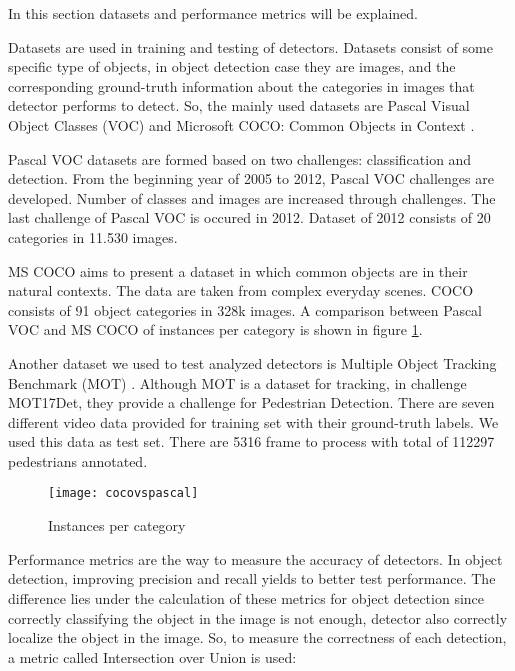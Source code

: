 \documentclass{article}
\begin{document}
\setlength{\parindent}{6ex}

\indent

In this section datasets and performance metrics will be explained. \par 
Datasets are used in training and testing of detectors. Datasets consist of some 
specific type of objects, in object detection case they are images, and the 
corresponding ground-truth information about the categories in images that 
detector performs to detect. So, the mainly used datasets are Pascal Visual Object 
Classes (VOC) \cite{pascalvoc} and Microsoft COCO: Common Objects in Context 
\cite{mscoco}. \par

Pascal VOC datasets are formed based on two challenges: classification and detection. From the 
beginning year of 2005 to 2012, Pascal VOC challenges are developed. Number of classes and images 
are increased through challenges. The last challenge of Pascal VOC is occured in 2012. Dataset of 
2012 consists of 20 categories in 11.530 images. \par

MS COCO aims to present a dataset in which common objects are in their natural 
contexts. The data are taken from complex everyday scenes. COCO consists of 91 
object categories in 328k images. A comparison between Pascal VOC and MS COCO 
of instances per category is shown in figure \ref{fig:cocovspascal1}. \par

Another dataset we used to test analyzed detectors is Multiple Object Tracking Benchmark 
(MOT) \cite{mot}. Although MOT is a dataset for tracking, in challenge MOT17Det, they provide a 
challenge for Pedestrian Detection. There are seven different video data provided for 
training set with their ground-truth labels. We used this data as test set. There are 
5316 frame to process with total of 112297 pedestrians annotated. 

\begin{figure}
    \centering
    \texttt{[image: cocovspascal]}
    \caption{Instances per category}
    \label{fig:cocovspascal1}
\end{figure}
\indent

Performance metrics are the way to measure the accuracy of detectors. In object 
detection, improving precision and recall yields to better test performance. The 
difference lies under the calculation of these metrics for object detection since 
correctly classifying the object in the image is not enough, detector also correctly 
localize the object in the image. So, to measure the correctness of each detection, 
a metric called Intersection over Union is used:
\end{document}
